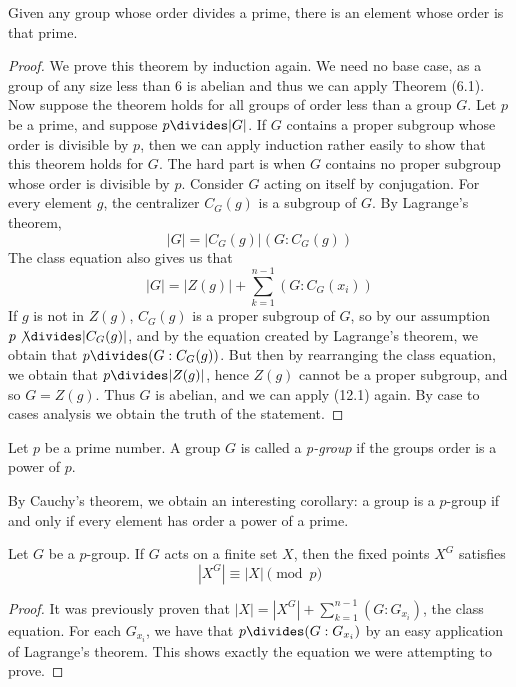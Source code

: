 \begin{theorem} 
    Given any group whose order divides a prime, there is an element whose order is that prime.
\end{theorem}
\begin{proof}
    We prove this theorem by induction again. We need no base case, as a group of any size less than 6 is abelian and thus we can apply Theorem (6.1). Now suppose the theorem holds for all groups of order less than a group $G$. Let $p$ be a prime, and suppose $p \divides |G|$. If $G$ contains a proper subgroup whose order is divisible by $p$, then we can apply induction rather easily to show that this theorem holds for $G$. The hard part is when $G$ contains no proper subgroup whose order is divisible by $p$. Consider $G$ acting on itself by conjugation. For every element $g$, the centralizer $C_G(g)$ is a subgroup of $G$. By Lagrange's theorem,
    \[ |G| = |C_G(g)|(G:C_G(g)) \]
    The class equation also gives us that
    \[ |G| = |Z(g)| + \sum_{k = 1}^{n-1} (G:C_G(x_i)) \]
    If $g$ is not in $Z(g)$, $C_G(g)$ is a proper subgroup of $G$, so by our assumption $p \not \divides |C_G(g)|$, and by the equation created by Lagrange's theorem, we obtain that $p \divides (G:C_G(g))$. But then by rearranging the class equation, we obtain that $p \divides |Z(g)|$, hence $Z(g)$ cannot be a proper subgroup, and so $G = Z(g)$. Thus $G$ is abelian, and we can apply (12.1) again. By case to cases analysis we obtain the truth of the statement.
\end{proof}

Let $p$ be a prime number. A group $G$ is called a \emph{p-group}  if the groups order is a power of $p$.

By Cauchy's theorem, we obtain an interesting corollary: a group is a $p$-group if and only if every element has order a power of a prime.

\begin{lemma}
    Let $G$ be a $p$-group. If $G$ acts on a finite set $X$, then the fixed points $X^G$ satisfies
    \[ |X^G| \equiv |X| \pmod{p} \]
\end{lemma}
\begin{proof}
    It was previously proven that $|X| = |X^G| + \sum_{k=1}^{n-1} (G:G_{x_i})$, the class equation. For each $G_{x_i}$, we have that $p \divides (G:G_{x_i})$ by an easy application of Lagrange's theorem. This shows exactly the equation we were attempting to prove.
\end{proof}

